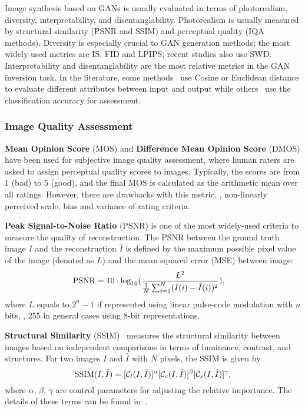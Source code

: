 Image synthesis based on GANs is usually evaluated in terms of photorealism, diversity, interpretability, and disentanglability. 
Photorealism is usually measured by structural similarity (PSNR and SSIM) and perceptual quality (IQA methods). 
Diversity is especially crucial to GAN generation methods; the most widely used metrics are IS, FID and LPIPS; recent studies also use SWD.
Interpretability and disentanglability are the most relative metrics in the GAN inversion task. 
In the literature, some methods~\cite{nitzan2020harness} use Cosine or Euclidean distance to evaluate different attributes between input and output while others~\cite{voynov2020latent} use the classification accuracy for assessment.

\subsubsection{Image Quality Assessment}
\label{sec:iqa}

\noindent\textbf{Mean Opinion Score} (MOS) and \textbf{Difference Mean Opinion Score} (DMOS) have been used for subjective image quality assessment, where human raters are asked to assign perceptual quality scores to images.
Typically, the scores are from $1$ (bad) to $5$ (good), and the final MOS is calculated as the arithmetic mean over all ratings.
However, there are drawbacks with this metric, \eg, non-linearly perceived scale, bias and variance of rating criteria.



\vspace{1mm}
\noindent\textbf{Peak Signal-to-Noise Ratio} (PSNR) is one of the most widely-used criteria to measure the quality of reconstruction.
The PSNR between the ground truth image $I$ and the reconstruction $\hat{I}$ is defined by the maximum possible pixel value of the image (denoted as $L$) and the mean squared error (MSE) between image:
\begin{align}
{\rm PSNR} &= 10 \cdot \log_{10} (\frac {L^2} {\frac{1}{N} \sum_{i=1}^{N} (I(i) - \hat{I}(i))^2}),
\label{eqn:mse}
\end{align}
where $L$ equals to $2^{n}-1$ if represented using linear pulse-code modulation with $n$ bits, \eg, $255$ in general cases using 8-bit representations.

\vspace{1mm}
\noindent\textbf{Structural Similarity} (SSIM)~\cite{TIP2004ImageWang} measures the structural similarity between images based on independent comparisons in terms of luminance, contrast, and structures.
For two images $I$ and $\hat{I}$ with $N$ pixels, the SSIM is given by
\begin{equation}
\label{eqn:ssim}
{\rm SSIM}(I, \hat{I}) = [\mathcal{C}_l(I, \hat{I})]^\alpha
                         [\mathcal{C}_c(I, \hat{I})]^\beta
                         [\mathcal{C}_s(I, \hat{I})]^\gamma,
\end{equation}
where $\alpha$, $\beta$, $\gamma$ are control parameters for adjusting the relative importance. 
The details of these terms can be found in~\cite{TIP2004ImageWang}.






